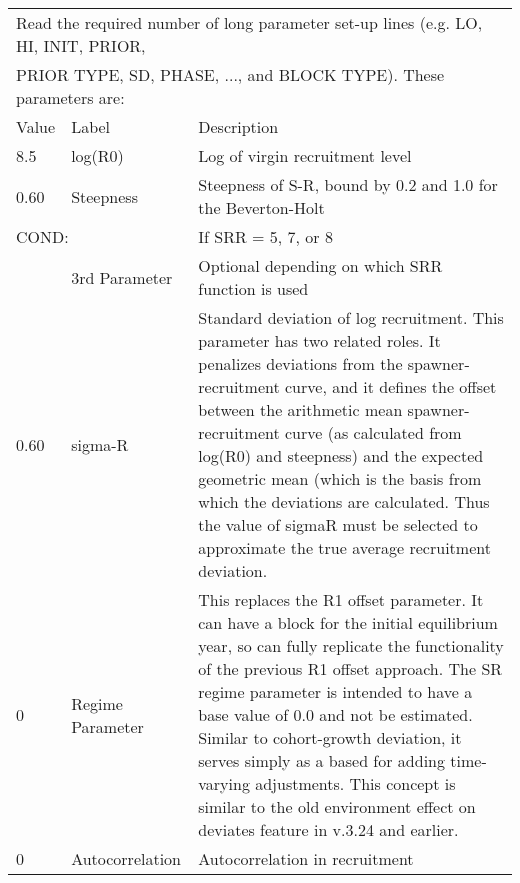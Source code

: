 \begin{center}
	\begin{longtable}{p{1cm} p{3cm} p{11cm}}
	      
		\multicolumn{3}{l}{Read the required number of long parameter set-up lines (e.g. LO, HI, INIT, PRIOR, }\\
		\multicolumn{3}{l}{PRIOR TYPE, SD, PHASE, ..., and BLOCK TYPE).  These parameters are:}\\
		\hline
		Value & Label &  Description\\
		\hline
		8.5 & log(R0) & Log of virgin recruitment level \\
		\hline
		0.60 & Steepness  & Steepness of S-R, bound by 0.2 and 1.0 for the Beverton-Holt \\
		\hline
		\multicolumn{2}{l}{COND:} & If SRR = 5, 7, or 8\\
		& 3rd Parameter & Optional depending on which SRR function is used \\
		\hline
		0.60 & sigma-R &  Standard deviation of log recruitment.
		This parameter has two related roles.  It penalizes deviations from the spawner-recruitment curve, and it defines the offset between the arithmetic mean spawner-recruitment curve (as calculated from log(R0) and steepness) and the expected geometric mean (which is the basis from which the deviations are calculated.  Thus the value of sigmaR must be selected to approximate the true average recruitment deviation.\\
		\hline
		0 & Regime Parameter & This replaces the R1 offset parameter.  It can have a block for the initial equilibrium year, so can fully replicate the functionality of the previous R1 offset approach.  The SR regime parameter is intended to have a base value of 0.0 and not be estimated.  Similar to cohort-growth deviation, it serves simply as a based for adding time-varying adjustments.  This concept is similar to the old environment effect on deviates feature in v.3.24 and earlier.\\
		\hline
		0 & Autocorrelation & Autocorrelation in recruitment \\
		\hline
	\end{longtable}
\end{center}


